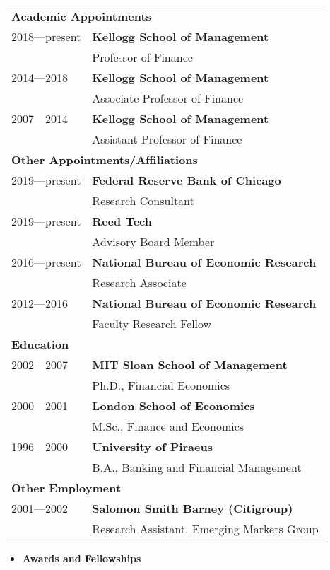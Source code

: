 \documentclass[11pt,letterpaper,serif,overlapped]{res}
\begin{document}
\begin{resume}
\begin{tabular}{ll}\\[1cm]
\multicolumn{2}{l}{\textbf{Academic Appointments}}\\
[0.25cm]
2018---present & \textbf{Kellogg School of Management}\\
& Professor of Finance\\
2014---2018 & \textbf{Kellogg School of Management}\\
& Associate Professor of Finance\\
 2007---2014 & \textbf{Kellogg School of Management}\\
& Assistant Professor of Finance\\
[0.5cm]
\multicolumn{2}{l}{\textbf{Other Appointments/Affiliations}}\\
[0.25cm]
2019---present & \textbf{Federal Reserve Bank of Chicago}\\
& Research Consultant \\[0.1cm]
2019---present & \textbf{Reed Tech}\\
& Advisory Board Member\\[0.1cm]
2016---present & \textbf{National Bureau of Economic Research  }\\
& Research Associate\\[0.1cm]
2012---2016 & \textbf{National Bureau of Economic Research}\\
& Faculty Research Fellow\\
[0.5cm]
\multicolumn{2}{l}{\textbf{Education}}\\
[0.25cm]
2002---2007 & \textbf{MIT Sloan School of Management}\\
& Ph.D., Financial Economics\\[0.1cm]
2000---2001 & \textbf{London School of Economics}\\
& M.Sc., Finance and Economics \\[0.1cm]
1996---2000 & \textbf{University of Piraeus} \\
& B.A., Banking and Financial Management\\
[0.5cm]
\multicolumn{2}{l}{\textbf{Other Employment}}\\
[0.25cm]
2001---2002 & \textbf{Salomon Smith Barney (Citigroup)}\\
& Research Assistant, Emerging Markets Group\\
\end{tabular}
\clearpage
\begin{itemize}
\item \textbf{Awards and Fellowships}\\

\end{itemize}
\end{resume}
\end{document}
